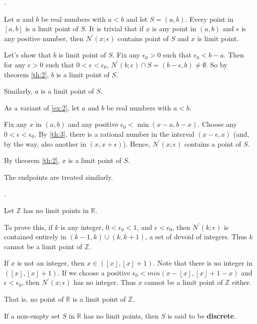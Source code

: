 \documentclass[8pt]{beamer}
\newcommand{\mbb}[1]{\mathbb{#1}}
\newcommand{\tb}[1]{\textbf{#1}}
\newcommand{\floor}[1]{\left\lfloor #1 \right \rfloor}
\begin{document}
\begin{frame}{.}
    \begin{example} \label{ex:2}
        Let $a$ and $b$ be real numbers with $a < b$ and let $S=(a,b)$.
        Every point in $[a,b]$ is a limit point of $S$.
        It is trivial that if $x$ is any point in $(a,b)$ and $\epsilon$ is any positive number, then $N^\prime(x;\epsilon)$ contains point of $S$ and $x$ is limit point.

        Let's show that $b$ is limit point of $S$.
        Fix any $\epsilon_0 > 0$ such that $\epsilon_0 < b-a$.
        Then for any $\epsilon >0$ such that $0 < \epsilon < \epsilon_0$, $N^\prime(b; \epsilon) \cap S = (b-\epsilon, b) \neq \emptyset$.
        So by theorem \ref{th:2}, $b$ is a limit point of $S$.

        Similarly, $a$ is a limit point of $S$.
    \end{example}

    \begin{example}
        As a variant of \ref{ex:2}, let $a$ and $b$ be real numbers with $a<b$.

        Fix any $x$ in $(a,b)$ and any positive $\epsilon_0 < \min(x-a, b-x)$.
        Choose any $0 < \epsilon < \epsilon_0$.
        By \ref{th:3}, there is a rational number in the interval $(x-\epsilon, x)$ (and, by the way, also another in $(x, x+\epsilon)$).
        Hence, $N^\prime(x;\epsilon)$ contains a point of $S$.

        By theorem \ref{th:2}, $x$ is a limit point of $S$.

        The endpoints are treated similarly.
    \end{example}
\end{frame}

\begin{frame}{.}
    \begin{example}
        Let $\mbb{Z}$ has no limit points in $\mbb{R}$.

        To prove this, if $k$ is any integer, $0 < \epsilon_0 <1$, and $\epsilon < \epsilon_0$, then $N^\prime(k; \epsilon)$ is contained entirely in $(k-1, k) \cup (k, k+1)$, a set of devoid of integers.
        Thus $k$ cannot be a limit point of $\mbb{Z}$.

        If $x$ is not an integer, then $x \in (\floor{x}, \floor{x}+1)$.
        Note that there is no integer in $(\floor{x}, \floor{x}+1)$.
        If we choose a positive $\epsilon_0 < 
        min(x - \floor{x}, \floor{x}+1 - x)$ and $\epsilon < \epsilon_0$, then $N^\prime(x;\epsilon)$ has no integer.
        Thus $x$ cannot be a limit point of $\mbb{Z}$ either.

        That is, no point of $\mbb{R}$ is a limit point of $\mbb{Z}$.
    \end{example}

    \begin{definition}
        If a non-empty set $S$ in $\mbb{R}$ has no limit points, then $S$ is said to be \tb{discrete}.
    \end{definition}
\end{frame}
\end{document}
